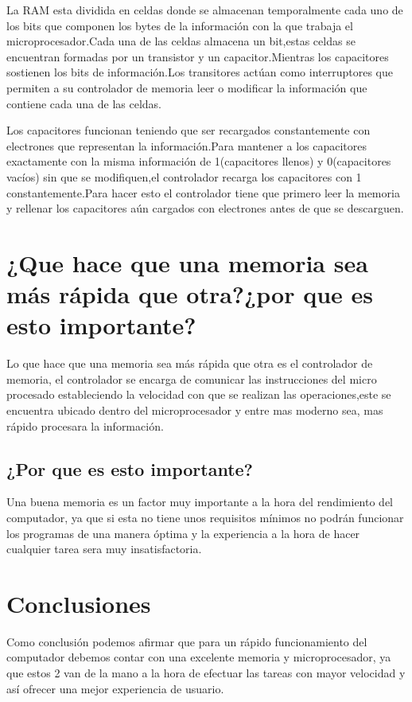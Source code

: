 \documentclass{article}
\begin{document}
La RAM esta dividida en celdas donde se almacenan temporalmente cada uno de los bits que componen los bytes  de la información con la que trabaja el microprocesador.Cada una de las celdas almacena un bit,estas celdas se encuentran formadas por un transistor y un capacitor.Mientras los capacitores sostienen los bits de información.Los transitores actúan como interruptores que permiten a su controlador de memoria leer o modificar la información que contiene cada una de las celdas.

Los capacitores funcionan teniendo que ser recargados constantemente con electrones que representan la información.Para mantener a los capacitores exactamente con la misma información de 1(capacitores llenos) y 0(capacitores vacíos) sin que se modifiquen,el controlador recarga los capacitores con 1 constantemente.Para hacer esto el controlador tiene que primero leer la memoria y rellenar los capacitores aún cargados con electrones antes de que se descarguen.

\section{¿Que hace que una memoria sea más rápida que otra?¿por que es esto importante?}
Lo que hace que una memoria sea más rápida que otra es el controlador de memoria, el controlador se encarga de comunicar las instrucciones del micro procesado estableciendo la velocidad con que se realizan las operaciones,este se encuentra ubicado dentro del microprocesador y entre mas moderno sea, mas rápido procesara la información.

\subsection{¿Por que es esto importante?}
Una buena memoria es un factor muy importante a la hora del rendimiento del computador, ya que si esta no tiene unos requisitos mínimos no podrán funcionar los programas de una manera óptima y la experiencia a la hora de hacer cualquier tarea sera muy insatisfactoria.

\section{Conclusiones }
Como conclusión podemos afirmar que para un rápido funcionamiento del computador debemos contar con una excelente memoria y microprocesador, ya que estos 2 van de la mano a la hora de efectuar las tareas con mayor velocidad  y así ofrecer una mejor experiencia de usuario.





 \cite{referencia}
\end{document}
